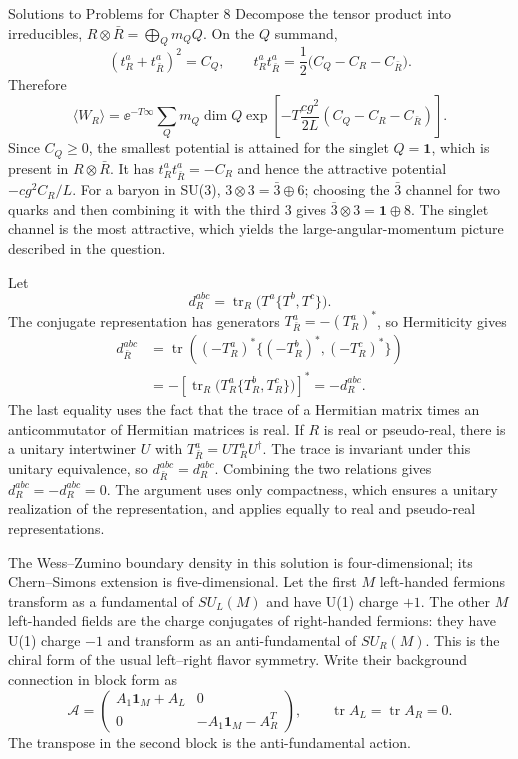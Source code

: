 \begin{bankssolutions}{Solutions to Problems for Chapter 8}
Decompose the tensor product into irreducibles,
$R\otimes\bar R=\bigoplus_Qm_QQ$.  On the $Q$ summand,
\[
  (t_R^a+t_{\bar R}^a)^2=C_Q,
  \qquad
  t_R^at_{\bar R}^a
  =\frac12\bigl(C_Q-C_R-C_{\bar R}\bigr).
  \tag{8.4.4}
\]
Therefore
\[
  \langle W_R\rangle
  =\ee^{-T\infty}\sum_Qm_Q\dim Q
  \exp\!\left[-T\frac{cg^2}{2L}
  (C_Q-C_R-C_{\bar R})\right].
\]
Since $C_Q\geq0$, the smallest potential is attained for the singlet
$Q=\mathbf1$, which is present in $R\otimes\bar R$.  It has
$t_R^at_{\bar R}^a=-C_R$ and hence the attractive potential
$-cg^2C_R/L$.  For a baryon in SU(3),
$3\otimes3=\bar3\oplus6$; choosing the $\bar3$ channel for two quarks and
then combining it with the third $3$ gives
$\bar3\otimes3=\mathbf1\oplus8$.  The singlet channel is the most attractive,
which yields the large-angular-momentum picture described in the question.

Let
\[
  d_R^{abc}=\operatorname{tr}_R\bigl(T^a\{T^b,T^c\}\bigr).
\]
The conjugate representation has generators
$T_{\bar R}^a=-(T_R^a)^*$, so Hermiticity gives
\begin{align*}
  d_{\bar R}^{abc}
    &=\operatorname{tr}\left((-T_R^a)^*
      \{(-T_R^b)^*,(-T_R^c)^*\}\right)\\
    &=-\left[\operatorname{tr}_R
      \bigl(T_R^a\{T_R^b,T_R^c\}\bigr)\right]^*
     =-d_R^{abc}.
\end{align*}
The last equality uses the fact that the trace of a Hermitian matrix times an
anticommutator of Hermitian matrices is real.  If $R$ is real or pseudo-real,
there is a unitary intertwiner $U$ with
$T_{\bar R}^a=U T_R^aU^\dagger$.  The trace is invariant under this unitary
equivalence, so $d_{\bar R}^{abc}=d_R^{abc}$.  Combining the two relations
gives $d_R^{abc}=-d_R^{abc}=0$.  The argument uses only compactness, which
ensures a unitary realization of the representation, and applies equally to
real and pseudo-real representations.

The Wess--Zumino boundary density in this solution is four-dimensional; its
Chern--Simons extension is five-dimensional.
Let the first $M$ left-handed fermions transform as a fundamental of
$SU_L(M)$ and have U(1) charge $+1$.  The other $M$ left-handed fields are
the charge conjugates of right-handed fermions: they have U(1) charge $-1$
and transform as an anti-fundamental of $SU_R(M)$.  This is the chiral form of
the usual left--right flavor symmetry.  Write their background connection in
block form as
\[
  \mathcal A=\begin{pmatrix}
    A_1\mathbf 1_M+A_L&0\\[2pt]
    0&-A_1\mathbf 1_M-A_R^{T}
  \end{pmatrix},
  \qquad \operatorname{tr}A_L=\operatorname{tr}A_R=0 .
  \tag{8.6.1}
\]
The transpose in the second block is the anti-fundamental action.


\end{bankssolutions}
